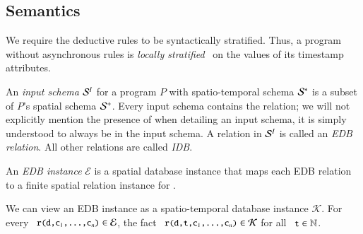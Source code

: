 


\subsection{Semantics}
\label{sec:semantics}
We require the deductive rules to be syntactically stratified.  Thus, a \lang program without asynchronous rules is {\em locally stratified}~\cite{local-strat} on the values of its timestamp attributes.


An {\em input schema} $\ischema$ for a \lang program $P$ with spatio-temporal schema $\stschema$ is a subset of $P$'s spatial schema $\sschema$.  Every input schema contains the  relation; we will not explicitly mention the presence of  when detailing an input schema, it is simply understood to always be in the input schema.  A relation in $\ischema$ is called an {\em EDB relation}.  All other relations are called {\em IDB}.

An {\em EDB instance} $\mathcal{E}$ is a spatial database instance that maps each EDB relation  to a finite spatial relation instance for .

We can view an EDB instance as a spatio-temporal database instance $\mathcal{K}$.  For every $\dedalus{r(d,c\sub{1},\ldots,c\sub{n})} \in \mathcal{E}$, the fact $\dedalus{r(d,t,c\sub{1},\ldots,c\sub{n})} \in \mathcal{K}$ for all $\dedalus{t} \in \mathbb{N}$.

